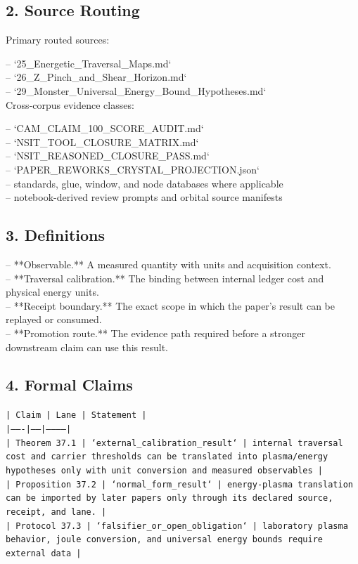 \documentclass[11pt]{article}
\begin{document}
\subsection*{2. Source Routing}

Primary routed sources:

\noindent{}-- `25\_Energetic\_Traversal\_Maps.md`\\
\noindent{}-- `26\_Z\_Pinch\_and\_Shear\_Horizon.md`\\
\noindent{}-- `29\_Monster\_Universal\_Energy\_Bound\_Hypotheses.md`\\

Cross-corpus evidence classes:

\noindent{}-- `CAM\_CLAIM\_100\_SCORE\_AUDIT.md`\\
\noindent{}-- `NSIT\_TOOL\_CLOSURE\_MATRIX.md`\\
\noindent{}-- `NSIT\_REASONED\_CLOSURE\_PASS.md`\\
\noindent{}-- `PAPER\_REWORKS\_CRYSTAL\_PROJECTION.json`\\
\noindent{}-- standards, glue, window, and node databases where applicable\\
\noindent{}-- notebook-derived review prompts and orbital source manifests\\

\subsection*{3. Definitions}

\noindent{}-- **Observable.** A measured quantity with units and acquisition context.\\
\noindent{}-- **Traversal calibration.** The binding between internal ledger cost and physical energy units.\\
\noindent{}-- **Receipt boundary.** The exact scope in which the paper's result can be replayed or consumed.\\
\noindent{}-- **Promotion route.** The evidence path required before a stronger downstream claim can use this result.\\

\subsection*{4. Formal Claims}

\noindent\texttt{| Claim | Lane | Statement |}\\
\noindent\texttt{|-------|------|-----------|}\\
\noindent\texttt{| Theorem 37.1 | `external\_calibration\_result` | internal traversal cost and carrier thresholds can be translated into plasma/energy hypotheses only with unit conversion and measured observables |}\\
\noindent\texttt{| Proposition 37.2 | `normal\_form\_result` | energy-plasma translation can be imported by later papers only through its declared source, receipt, and lane. |}\\
\noindent\texttt{| Protocol 37.3 | `falsifier\_or\_open\_obligation` | laboratory plasma behavior, joule conversion, and universal energy bounds require external data |}\\
\end{document}
